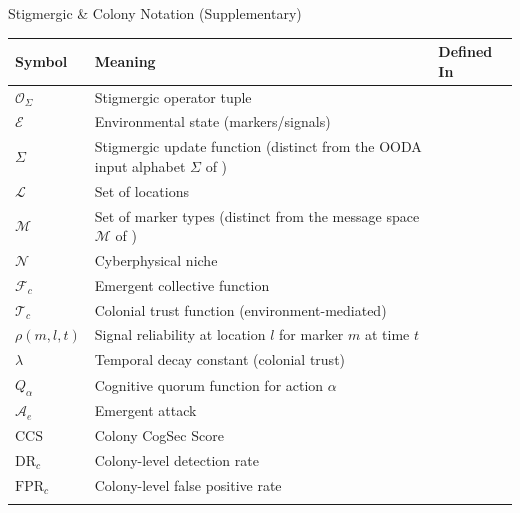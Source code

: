 \documentclass[
  ignorenonframetext,
]{beamer}
\newcounter{none} %
\providecommand{\cref}[1]{\texttt{\detokenize{#1}}}
\begin{document}
\begin{frame}[allowframebreaks]{Stigmergic \& Colony Notation
(Supplementary)}
{\def\LTcaptype{none} %
\begin{longtable}[]{@{}
  >{\raggedright\arraybackslash}p{}
  >{\raggedright\arraybackslash}p{}
  >{\raggedright\arraybackslash}p{}@{}}
\toprule\noalign{}
\begin{minipage}[b]{\linewidth}\raggedright
Symbol
\end{minipage} & \begin{minipage}[b]{\linewidth}\raggedright
Meaning
\end{minipage} & \begin{minipage}[b]{\linewidth}\raggedright
Defined In
\end{minipage} \\
\midrule\noalign{}
\endhead
\(\mathcal{O}_\Sigma\) & Stigmergic operator tuple &
\cref{def:stigmergic-operator} \\
\(\mathcal{E}\) & Environmental state (markers/signals) &
\cref{def:stigmergic-operator} \\
\(\Sigma\) & Stigmergic update function (distinct from the OODA input
alphabet \(\Sigma\) of \cref{def:ooda-state}) &
\cref{def:stigmergic-operator} \\
\(\mathcal{L}\) & Set of locations & \cref{def:stigmergic-operator} \\
\(\mathcal{M}\) & Set of marker types (distinct from the message space
\(\mathcal{M}\) of \cref{def:firewall}) &
\cref{def:stigmergic-operator} \\
\(\mathcal{N}\) & Cyberphysical niche &
\cref{def:cyberphysical-niche} \\
\(\mathcal{F}_c\) & Emergent collective function &
\cref{def:emergent-function} \\
\(\mathcal{T}_c\) & Colonial trust function (environment-mediated) &
\cref{def:colonial-trust} \\
\(\rho(m, l, t)\) & Signal reliability at location \(l\) for marker
\(m\) at time \(t\) & \cref{eq:colonial-trust} \\
\(\lambda\) & Temporal decay constant (colonial trust) &
\cref{eq:colonial-trust} \\
\(Q_\alpha\) & Cognitive quorum function for action \(\alpha\) &
\cref{def:cognitive-quorum} \\
\(\mathcal{A}_e\) & Emergent attack & \cref{def:emergent-attack} \\
\(\text{CCS}\) & Colony CogSec Score & \cref{def:cogsec-score} \\
\(\text{DR}_c\) & Colony-level detection rate & \cref{eq:ccs} \\
\(\text{FPR}_c\) & Colony-level false positive rate & \cref{eq:ccs} \\
\bottomrule\noalign{}
\end{longtable}
}
\end{frame}
\end{document}
